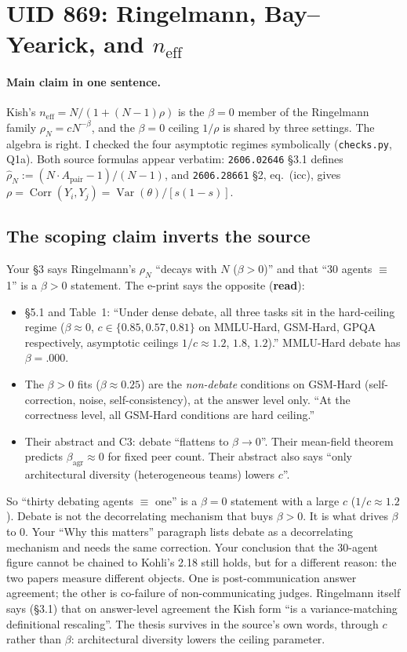 \documentclass[11pt]{article}
\newcommand{\Var}{\operatorname{Var}}
\newcommand{\Corr}{\operatorname{Corr}}
\begin{document}
\section{UID 869: Ringelmann, Bay--Yearick, and $n_{\mathrm{eff}}$}

\paragraph{Main claim in one sentence.} Kish's $n_{\mathrm{eff}}=N/(1+(N-1)\rho)$ is the $\beta=0$ member of the Ringelmann family $\rho_N=cN^{-\beta}$, and the $\beta=0$ ceiling $1/\rho$ is shared by three settings.
The algebra is right. I checked the four asymptotic regimes symbolically (\texttt{checks.py}, Q1a).
Both source formulas appear verbatim: \texttt{2606.02646} \S3.1 defines $\hat\rho_N:=(N\cdot A_{\mathrm{pair}}-1)/(N-1)$, and \texttt{2606.28661} \S2, eq.~(icc), gives $\rho=\Corr(Y_i,Y_j)=\Var(\theta)/[s(1-s)]$.

\subsection{The scoping claim inverts the source}
Your \S3 says Ringelmann's $\rho_N$ ``decays with $N$ ($\beta>0$)'' and that ``30 agents $\equiv$ 1'' is a $\beta>0$ statement. The e-print says the opposite (\textbf{read}):
\begin{itemize}[nosep]
\item \S5.1 and Table~1: ``Under dense debate, all three tasks sit in the hard-ceiling regime ($\beta\approx0$, $c\in\{0.85,0.57,0.81\}$ on MMLU-Hard, GSM-Hard, GPQA respectively, asymptotic ceilings $1/c\approx1.2$, $1.8$, $1.2$).'' MMLU-Hard debate has $\beta=.000$.
\item The $\beta>0$ fits ($\beta\approx0.25$) are the \emph{non-debate} conditions on GSM-Hard (self-correction, noise, self-consistency), at the answer level only. ``At the correctness level, all GSM-Hard conditions are hard ceiling.''
\item Their abstract and C3: debate ``flattens to $\beta\to0$''. Their mean-field theorem predicts $\beta_{\mathrm{agr}}\approx0$ for fixed peer count. Their abstract also says ``only architectural diversity (heterogeneous teams) lowers $c$''.
\end{itemize}
So ``thirty debating agents $\equiv$ one'' is a $\beta=0$ statement with a large $c$ ($1/c\approx1.2$). Debate is not the decorrelating mechanism that buys $\beta>0$. It is what drives $\beta$ to $0$. Your ``Why this matters'' paragraph lists debate as a decorrelating mechanism and needs the same correction.
Your conclusion that the 30-agent figure cannot be chained to Kohli's 2.18 still holds, but for a different reason: the two papers measure different objects. One is post-communication answer agreement; the other is co-failure of non-communicating judges. Ringelmann itself says (\S3.1) that on answer-level agreement the Kish form ``is a variance-matching definitional rescaling''.
The thesis survives in the source's own words, through $c$ rather than $\beta$: architectural diversity lowers the ceiling parameter.
\end{document}
